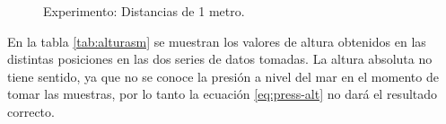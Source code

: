 \documentclass[main]{subfiles}
\begin{document}
\vspace{-25pt}
\begin{figure}[H]
\hspace{-70pt}
\vspace{-10pt}
  \caption{Experimento: Distancias de 1 metro.}
\label{fig:1m}
\end{figure}



En la tabla \ref{tab:alturasm} se muestran los valores de altura obtenidos en las distintas posiciones en las dos series de datos tomadas. La altura absoluta no tiene sentido, ya que no se conoce la presión a nivel del mar en el momento de tomar las muestras, por lo tanto la ecuación \ref{eq:press-alt} no dará el resultado correcto.
\end{document}
